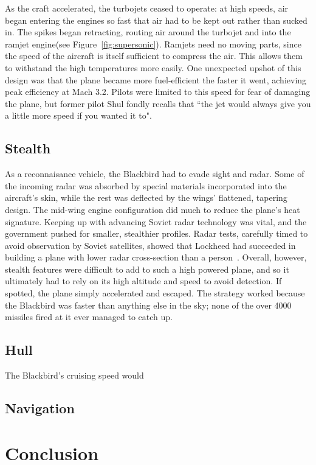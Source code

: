 \documentclass[12pt, draftclsnofoot, onecolumn, doublespaced]{IEEEtran}
\newcommand{\figref}[1]{Figure~\ref{fig:#1}}
\begin{document}
	As the craft accelerated, the turbojets ceased to operate: at high speeds, air began entering the engines so fast that air had to be kept out rather than sucked in. The spikes began retracting, routing air around the turbojet and into the ramjet engine(see \figref{supersonic}). Ramjets need no moving parts, since the speed of the aircraft is itself sufficient to compress the air. This allows them to withstand the high temperatures more easily. One unexpected upshot of this design was that the plane became more fuel-efficient the faster it went, achieving peak efficiency at Mach 3.2. Pilots were limited to this speed for fear of damaging the plane, but former pilot Shul fondly recalls that ``the jet would always give you a little more speed if you wanted it to"\cite{sleddriver}.
	

	\subsection{Stealth}
	
		As a reconnaisance vehicle, the Blackbird had to evade sight and radar. Some of the incoming radar was absorbed by special materials incorporated into the aircraft's skin, while the rest was deflected by the wings' flattened, tapering design. The mid-wing engine configuration did much to reduce the plane's heat signature. Keeping up with advancing Soviet radar technology was vital, and the government pushed for smaller, stealthier profiles. Radar tests, carefully timed to avoid observation by Soviet satellites, showed that Lockheed had succeeded in building a plane with lower radar cross-section than a person~\cite{creating}.
		Overall, however, stealth features were difficult to add to such a high powered plane, and so it ultimately had to rely on its high altitude and speed to avoid detection. If spotted, the plane simply accelerated and escaped. The strategy worked because the Blackbird was faster than anything else in the sky; none of the over 4000\cite{sleddriver} missiles fired at it ever managed to catch up.
		
	\subsection{Hull}
		The Blackbird's cruising speed would 
	\subsection{Navigation}

\section{Conclusion}


{}

\end{document}
